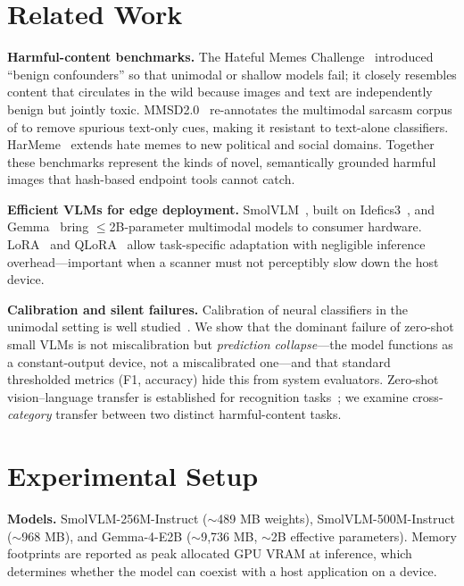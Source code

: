 \documentclass[sigconf,nonacm]{acmart}
\begin{document}
\section{Related Work}
\textbf{Harmful-content benchmarks.} The Hateful Memes Challenge~\cite{kiela2020hateful}
introduced ``benign confounders'' so that unimodal or shallow models fail; it closely
resembles content that circulates in the wild because images and text are independently
benign but jointly toxic. MMSD2.0~\cite{qin2023mmsd2} re-annotates the multimodal sarcasm
corpus of \citet{cai2019multimodal} to remove spurious text-only cues, making it resistant
to text-alone classifiers. HarMeme~\cite{pramanick2021harmeme} extends hate memes to new
political and social domains. Together these benchmarks represent the kinds of novel,
semantically grounded harmful images that hash-based endpoint tools cannot catch.

\textbf{Efficient VLMs for edge deployment.} SmolVLM~\cite{marafioti2025smolvlm}, built on
Idefics3~\cite{laurencon2024idefics3}, and Gemma~\cite{gemma2025} bring
$\leq$2B-parameter multimodal models to consumer hardware. LoRA~\cite{hu2022lora} and
QLoRA~\cite{dettmers2023qlora} allow task-specific adaptation with negligible inference
overhead---important when a scanner must not perceptibly slow down the host device.

\textbf{Calibration and silent failures.} Calibration of neural classifiers in the unimodal
setting is well studied~\cite{guo2017calibration}. We show that the dominant failure of
zero-shot small VLMs is not miscalibration but \emph{prediction collapse}---the model
functions as a constant-output device, not a miscalibrated one---and that standard
thresholded metrics (F1, accuracy) hide this from system evaluators. Zero-shot
vision--language transfer is established for recognition tasks~\cite{radford2021clip}; we
examine cross-\emph{category} transfer between two distinct harmful-content tasks.

\section{Experimental Setup}\label{sec:setup}
\textbf{Models.} SmolVLM-256M-Instruct ($\sim$489 MB weights), SmolVLM-500M-Instruct
($\sim$968 MB), and Gemma-4-E2B ($\sim$9,736 MB, $\sim$2B effective parameters). Memory
footprints are reported as peak allocated GPU VRAM at inference, which determines whether
the model can coexist with a host application on a device.
\end{document}
